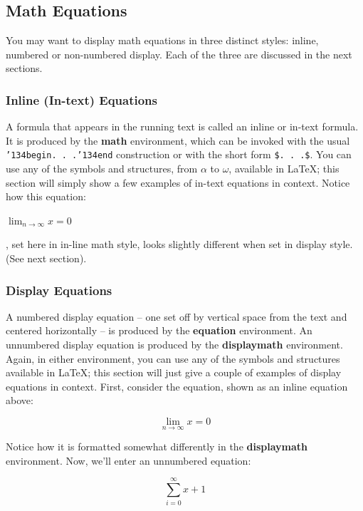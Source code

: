 \documentclass{sig-alternate-05-2015}
\begin{document}
\subsection{Math Equations}
You may want to display math equations in three distinct styles: inline, numbered or non-numbered display.  Each of the three are discussed in the next sections. 

\subsubsection{Inline (In-text) Equations}
A formula that appears in the running text is called an inline or in-text formula. It is produced by the \textbf{math} environment, which can be invoked with the usual \texttt{{\char'134}begin. . .{\char'134}end} construction or with the short form \texttt{\$. . .\$}. You can use any of the symbols and structures, from $\alpha$ to $\omega$, available in \LaTeX\cite{Lamport:LaTeX}; this section will simply show a few examples of in-text equations in context. Notice how this equation: 

\begin{math}
	\lim_{n\rightarrow \infty}x=0
\end{math}

, set here in in-line math style, looks slightly different when set in display style.  (See next section). 

\subsubsection{Display Equations}
A numbered display equation -- one set off by vertical space from the text and centered horizontally -- is produced by the \textbf{equation} environment. An unnumbered display equation is produced by the \textbf{displaymath} environment. Again, in either environment, you can use any of the symbols and structures available in \LaTeX; this section will just give a couple of examples of display equations in context. First, consider the equation, shown as an inline equation above:

\begin{equation}
	\lim_{n\rightarrow \infty}x=0
\end{equation}

Notice how it is formatted somewhat differently in the \textbf{displaymath} environment.  Now, we'll enter an unnumbered equation: 

\begin{displaymath}
	\sum_{i=0}^{\infty} x + 1
\end{displaymath} 
\end{document}

